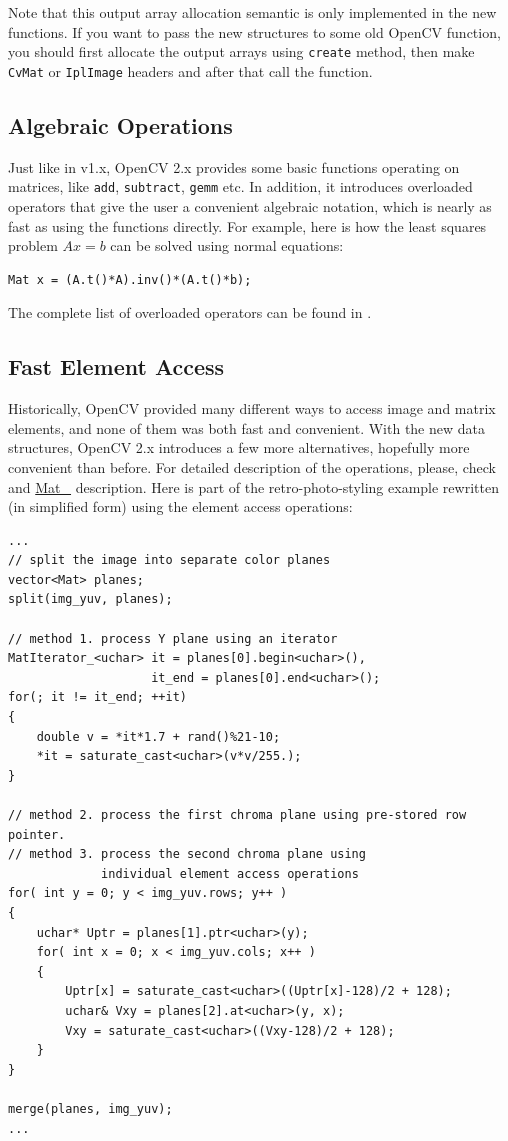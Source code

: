 Note that this output array allocation semantic is only implemented in the new functions. If you want to pass the new structures to some old OpenCV function, you should first allocate the output arrays using \texttt{create} method, then make \texttt{CvMat} or \texttt{IplImage} headers and after that call the function.

\subsection{Algebraic Operations}

Just like in v1.x, OpenCV 2.x provides some basic functions operating on matrices, like \texttt{add},
\texttt{subtract}, \texttt{gemm} etc. In addition, it introduces overloaded operators that give the user a convenient
algebraic notation, which is nearly as fast as using the functions directly. For example, here is how the least squares problem $Ax=b$
can be solved using normal equations:
\begin{lstlisting}
Mat x = (A.t()*A).inv()*(A.t()*b);
\end{lstlisting}

The complete list of overloaded operators can be found in .

\subsection{Fast Element Access}

Historically, OpenCV provided many different ways to access image and matrix elements, and none of them was both fast and convenient.
With the new data structures, OpenCV 2.x introduces a few more alternatives, hopefully more convenient than before. For detailed description of the operations, please, check  and \hyperref[MatT]{Mat\_} description. Here is part of the retro-photo-styling example rewritten (in simplified form) using the element access operations:

\begin{lstlisting}
...
// split the image into separate color planes
vector<Mat> planes;
split(img_yuv, planes);

// method 1. process Y plane using an iterator
MatIterator_<uchar> it = planes[0].begin<uchar>(),
                    it_end = planes[0].end<uchar>();
for(; it != it_end; ++it)
{
    double v = *it*1.7 + rand()%21-10;
    *it = saturate_cast<uchar>(v*v/255.);
}

// method 2. process the first chroma plane using pre-stored row pointer.
// method 3. process the second chroma plane using
             individual element access operations
for( int y = 0; y < img_yuv.rows; y++ )
{
    uchar* Uptr = planes[1].ptr<uchar>(y);
    for( int x = 0; x < img_yuv.cols; x++ )
    {
        Uptr[x] = saturate_cast<uchar>((Uptr[x]-128)/2 + 128);
        uchar& Vxy = planes[2].at<uchar>(y, x);
        Vxy = saturate_cast<uchar>((Vxy-128)/2 + 128);
    }
}

merge(planes, img_yuv);
...
\end{lstlisting}


